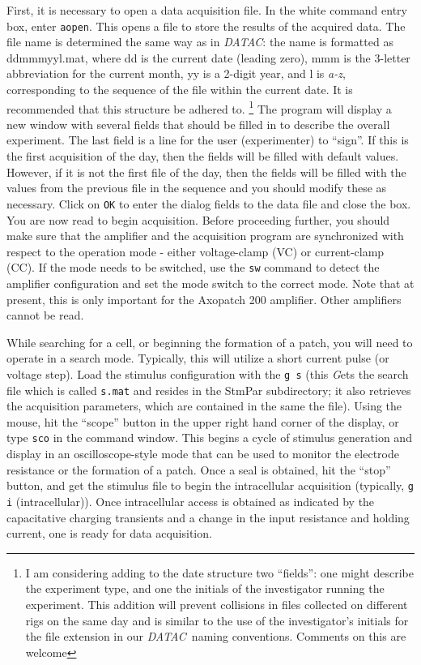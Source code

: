 \documentclass[11pt, letterpaper, titlepage]{paper}
\newcommand{\datac}{\textsl{DATAC}}
\begin{document}
First, it is necessary to open a data acquisition file. In the 
white command entry box, enter \texttt{aopen}. This opens a file 
to store the results of the acquired data. The file name is 
determined the same way as in \datac: the name is formatted as 
ddmmmyyl.mat, where dd is the current date (leading zero), mmm is 
the 3-letter abbreviation for the current month, yy is a 2-digit 
year, and l is \textit{a-z}, corresponding to the sequence of the 
file within the current date. It is recommended that this 
structure be adhered to. \footnote{I am considering adding to the 
date structure two ``fields'': one might describe the experiment 
type, and one the initials of the investigator running the 
experiment. This addition will prevent collisions in files 
collected on different rigs on the same day and is similar to the 
use of the investigator's initials for the file extension in our 
\datac\ naming conventions. Comments on this are welcome} The 
program will display a new window with several fields that should 
be filled in to describe the overall experiment. The last field is 
a line for the user (experimenter) to ``sign''. If this is the 
first acquisition of the day, then the fields will be filled with 
default values. However, if it is not the first file of the day, 
then the fields will be filled with the values from the previous 
file in the sequence and you should modify these as necessary. 
Click on \texttt{OK} to enter the dialog fields to the data file 
and close the box. You are now read to begin acquisition. Before 
proceeding further, you should make sure that the amplifier and 
the acquisition program are synchronized with respect to the 
operation mode - either voltage-clamp (VC) or current-clamp (CC). 
If the mode needs to be switched, use the \texttt{sw} command to 
detect the amplifier configuration and set the mode switch to the 
correct mode. Note that at present, this is only important for the 
Axopatch 200 amplifier. Other amplifiers cannot be read.

While searching for a cell, or beginning the formation of a patch, 
you will need to operate in a search mode. Typically, this will 
utilize a short current pulse (or voltage step). Load the stimulus 
configuration with the \texttt{g s} (this \textsl{G}ets the search 
file which is called \texttt{s.mat} and resides in the StmPar 
subdirectory; it also retrieves the acquisition parameters, which 
are contained in the same the file). Using the mouse, hit the 
``scope'' button in the upper right hand corner of the display, or 
type \texttt{sco} in the command window. This begins a cycle of 
stimulus generation and display in an oscilloscope-style mode that 
can be used to monitor the electrode resistance or the formation 
of a patch. Once a seal is obtained, hit the ``stop'' button, and 
get the stimulus file to begin the intracellular acquisition 
(typically, \texttt{g i} (intracellular)). Once intracellular 
access is obtained as indicated by the capacitative charging 
transients and a change in the input resistance and holding 
current, one is ready for data acquisition.
\end{document}
